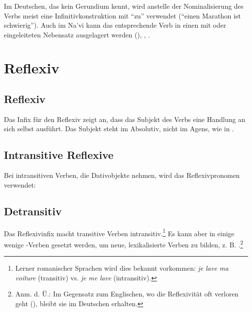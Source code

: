 \subsubsection{} Im Deutschen, das kein Gerundium kennt, wird anstelle der Nominalisierung des Verbs meist eine Infinitivkonstruktion mit ``zu'' verwendet (``einen Marathon  ist schwierig''). Auch im Na'vi kann das entsprechende Verb in einen mit  oder  eingeleiteten Nebensatz ausgelagert werden (), , . 

\section{Reflexiv}
\subsection{Reflexiv} Das Infix für den Reflexiv  zeigt an, dass das Subjekt des Verbs eine Handlung an sich selbst ausführt. Das Subjekt steht im Absolutiv, nicht im Agens, wie in  .

\subsection{Intransitive Reflexive} Bei intransitiven Verben, die Dativobjekte nehmen, wird das Reflexivpronomen  verwendet:

\begin{quotation}
	\noindent{} 
\end{quotation} 
\noindent {}

\subsection{Detransitiv} Das Reflexivinfix macht transitive Verben intransitiv.\footnote{Lerner romanischer Sprachen wird dies bekannt vorkommen: \textit{je lave ma voiture} (transitiv) vs. \textit{je me lave} (intransitiv).} Es kann aber in einige wenige -Verben gesetzt werden, um neue, lexikalisierte Verben zu bilden, z. B.  .\footnote{Anm. d. Ü.: Im Gegensatz zum Englischen, wo die Reflexivität oft verloren geht (), bleibt sie im Deutschen erhalten.}

